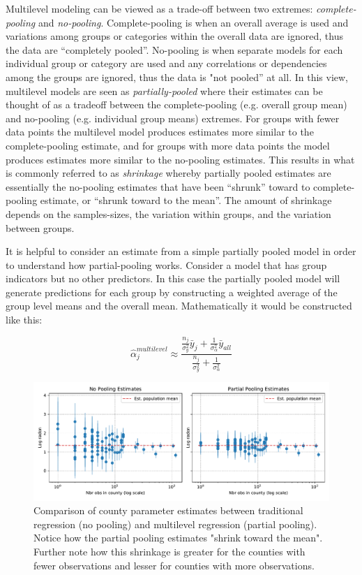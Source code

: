 Multilevel modeling can be viewed as a trade-off between two extremes: \textit{complete-pooling} and \textit{no-pooling}. Complete-pooling is when an overall average is used and variations among groups or categories within the overall data are ignored, thus the data are ``completely pooled”. No-pooling is when separate models for each individual group or category are used and any correlations or dependencies among the groups are ignored, thus the data is "not pooled” at all. In this view, multilevel models are seen as \textit{partially-pooled} where their estimates can be thought of as a tradeoff between the complete-pooling (e.g. overall group mean) and no-pooling (e.g. individual group means) extremes. For groups with fewer data points the multilevel model produces estimates more similar to the complete-pooling estimate, and for groups with more data points the model produces estimates more similar to the no-pooling estimates. This results in what is commonly referred to as \textit{shrinkage} whereby partially pooled estimates are essentially the no-pooling estimates that have been “shrunk” toward to complete-pooling estimate, or “shrunk toward to the mean”. The amount of shrinkage depends on the samples-sizes, the variation within groups, and the variation between groups.

It is helpful to consider an estimate from a simple partially pooled model in order to understand how partial-pooling works. Consider a model that has group indicators but no other predictors. In this case the partially pooled model will generate predictions for each group by constructing a weighted average of the group level means and the overall mean. Mathematically it would be constructed like this:

\begin{equation} \label{eq:mlm_ex}
\hat{\alpha}_j^{multilevel} \approx \frac{ \frac{n_j}{\sigma_y^2} \bar{y}_j + \frac{1}{\sigma_{\alpha}^2} \bar{y}_{all} }{ \frac{n_j}{\sigma_y^2} + \frac{1}{\sigma_{\alpha}^2} }
\end{equation}

\begin{figure}
	\centering
	\includegraphics[width=\textwidth]{figures/radon_example.pdf}
	\caption{Comparison of county parameter estimates between traditional regression (no pooling) and multilevel regression (partial pooling). Notice how the partial pooling estimates "shrink toward the mean". Further note how this shrinkage is greater for the counties with fewer observations and lesser for counties with more observations.}
	\label{fig:radon_example}
\end{figure}

